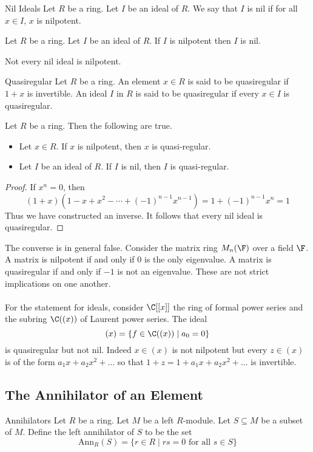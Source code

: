 \documentclass[a4paper]{article}
\begin{document}
\begin{defn}{Nil Ideals}{} Let $R$ be a ring. Let $I$ be an ideal of $R$. We say that $I$ is nil if for all $x\in I$, $x$ is nilpotent. 
\end{defn}

\begin{lmm}{}{} Let $R$ be a ring. Let $I$ be an ideal of $R$. If $I$ is nilpotent then $I$ is nil. 
\end{lmm}

Not every nil ideal is nilpotent. 

\begin{defn}{Quasiregular}{} Let $R$ be a ring. An element $x\in R$ is said to be quasiregular if $1+x$ is invertible. An ideal $I$ in $R$ is said to be quasiregular if every $x\in I$ is quasiregular. 
\end{defn}

\begin{lmm}{}{} Let $R$ be a ring. Then the following are true. 
\begin{itemize}
\item Let $x\in R$. If $x$ is nilpotent, then $x$ is quasi-regular. 
\item Let $I$ be an ideal of $R$. If $I$ is nil, then $I$ is quasi-regular. 
\end{itemize}
\begin{proof}
If $x^n=0$, then $$(1+x)(1-x+x^2-\cdots+(-1)^{n-1}x^{n-1})=1+(-1)^{n-1}x^n=1$$ Thus we have constructed an inverse. It follows that every nil ideal is quasiregular. 
\end{proof}
\end{lmm}

The converse is in general false. Consider the matrix ring $M_n(\F)$ over a field $\F$. A matrix is nilpotent if and only if $0$ is the only eigenvalue. A matrix is quasiregular if and only if $-1$ is not an eigenvalue. These are not strict implications on one another. \\~\\

For the statement for ideals, consider $\C[[x]]$ the ring of formal power series and the subring $\C((x))$ of Laurent power series. The ideal $$(x)=\{f\in\C((x))\;|\;a_0=0\}$$ is quasiregular but not nil. Indeed $x\in(x)$ is not nilpotent but every $z\in(x)$ is of the form $a_1x+a_2x^2+\dots$ so that $1+z=1+a_1x+a_2x^2+\dots$ is invertible. 

\subsection{The Annihilator of an Element}
\begin{defn}{Annihilators}{} Let $R$ be a ring. Let $M$ be a left $R$-module. Let $S\subseteq M$ be a subset of $M$. Define the left annihilator of $S$ to be the set $$\text{Ann}_R(S)=\{r\in R\;|\;rs=0\text{ for all }s\in S\}$$
\end{defn}
\end{document}
